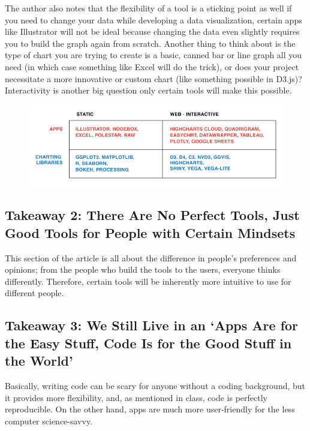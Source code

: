 \documentclass[]{book}
\theoremstyle{definition}
\theoremstyle{definition}
\theoremstyle{definition}
\theoremstyle{remark}
\begin{document}
The author also notes that the flexibility of a tool is a sticking point
as well if you need to change your data while developing a data
visualization, certain apps like Illustrator will not be ideal because
changing the data even slightly requires you to build the graph again
from scratch. Another thing to think about is the type of chart you are
trying to create is a basic, canned bar or line graph all you need (in
which case something like Excel will do the trick), or does your project
necessitate a more innovative or custom chart (like something possible
in D3.js)? Interactivity is another big question only certain tools will
make this possible.

\begin{figure}
\centering
\includegraphics{images/interactivity.png}
\caption{}
\end{figure}

\subsection{Takeaway 2: There Are No Perfect Tools, Just Good Tools for
People with Certain
Mindsets}\label{takeaway-2-there-are-no-perfect-tools-just-good-tools-for-people-with-certain-mindsets}

This section of the article is all about the difference in people's
preferences and opinions; from the people who build the tools to the
users, everyone thinks differently. Therefore, certain tools will be
inherently more intuitive to use for different people.

\subsection{\texorpdfstring{Takeaway 3: We Still Live in an `Apps Are
for the Easy Stuff, Code Is for the Good Stuff in the
World'}{Takeaway 3: We Still Live in an Apps Are for the Easy Stuff, Code Is for the Good Stuff in the World}}\label{takeaway-3-we-still-live-in-an-apps-are-for-the-easy-stuff-code-is-for-the-good-stuff-in-the-world}

Basically, writing code can be scary for anyone without a coding
background, but it provides more flexibility, and, as mentioned in
class, code is perfectly reproducible. On the other hand, apps are much
more user-friendly for the less computer science-savvy.
\end{document}
